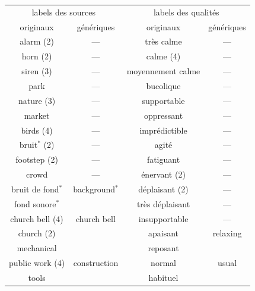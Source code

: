 \begin{table}[t]
\centering
\begin{tabular}{cc|cc}
\multicolumn{2}{c|}{labels des sources}         & \multicolumn{2}{c}{labels des qualités}      \\
originaux             & génériques              & originaux & génériques       \\
\hline
alarm (2)             & ---                     &  très calme            & --- \\
horn  (2)             & ---                     &  calme (4)             & ---   \\ 
siren (3)             & ---                     &  moyennement calme     & ---  \\ 
park                  & ---                     &  bucolique             & ---   \\
nature (3)            & ---                     &  supportable           & ---  \\
market                & ---                     &  oppressant            & ---\\
birds (4)             & ---                     &  imprédictible         & ---  \\ 
bruit$^*$ (2)         & ---                     &  agité                 & --- \\ 
footstep (2)          & ---                     &  fatiguant             & --- \\
crowd                 & ---                     &  énervant (2)          & --- \\
\cline{1-2}         
bruit de fond$^*$     & background$^*$          &  déplaisant (2)        & ---   \\ 
fond sonore$^*$       &                         &  très déplaisant       & ---    \\ 
\cline{1-2}
church bell (4)       & church bell             &  insupportable         & --- \\  \cline{3-4}
church (2)            &                         &  apaisant              & relaxing    \\ 
\cline{1-2}
mechanical            &                         &  reposant              &  \\ \cline{3-4}
public work  (4)      & construction            &  normal                & usual     \\ 
tools                 &                         &  habituel              & \\  	
\cline{1-2}			                                                             

\end{tabular}
\end{table}
